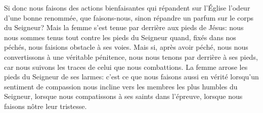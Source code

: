 Si donc nous faisons des actions bienfaisantes
		qui répandent sur l'Église l'odeur d'une bonne renommée,
	que faisons-nous, sinon répandre un parfum sur le corps du Seigneur?
Mais la femme s'est tenue par derrière aux pieds de Jésus:
	nous nous sommes tenus tout contre les pieds du Seigneur
	quand, fixés dans nos péchés, nous faisions obstacle à ses voies.
Mais si, après avoir péché, nous nous convertissons à une véritable pénitence,
	nous nous tenons par derrière à ses pieds,
	car nous suivons les traces de celui que nous combattions.
La femme arrose les pieds du Seigneur de ses larmes:
	c'est ce que nous faisons aussi en vérité lorsqu'un sentiment de compassion
		nous incline vers les membres les plus humbles du Seigneur,
	lorsque nous compatissons à ses saints dans l'épreuve,
	lorsque nous faisons nôtre leur tristesse.
